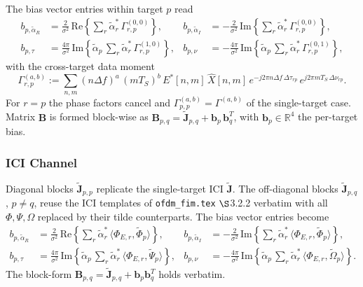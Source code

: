 \documentclass[11pt]{article}
\begin{document}
The bias vector entries within target \(p\) read
\begin{align}
    b_{p, \tilde{\alpha}_R} &= \tfrac{2}{\sigma^2}\, \mathrm{Re}\!\left\{ \sum_r \tilde{\alpha}_r^*\, \Gamma_{r,p}^{(0,0)} \right\}, &
    b_{p, \tilde{\alpha}_I} &= -\tfrac{2}{\sigma^2}\, \mathrm{Im}\!\left\{ \sum_r \tilde{\alpha}_r^*\, \Gamma_{r,p}^{(0,0)} \right\}, \\
    b_{p, \tau} &= \tfrac{4\pi}{\sigma^2}\, \mathrm{Im}\!\left\{ \tilde{\alpha}_p\, \sum_r \tilde{\alpha}_r^*\, \Gamma_{r,p}^{(1,0)} \right\}, &
    b_{p, \nu} &= -\tfrac{4\pi}{\sigma^2}\, \mathrm{Im}\!\left\{ \tilde{\alpha}_p\, \sum_r \tilde{\alpha}_r^*\, \Gamma_{r,p}^{(0,1)} \right\},
\end{align}
with the cross-target data moment
\begin{equation}
    \Gamma_{r,p}^{(a,b)} := \sum_{n,m} (n\Delta f)^a\, (mT_S)^b\, E^*[n,m]\, \hat{X}[n,m]\, e^{-j2\pi n\Delta f\, \Delta\tau_{rp}}\, e^{j2\pi mT_S\, \Delta\nu_{rp}}.
\end{equation}
For \(r = p\) the phase factors cancel and \(\Gamma_{p,p}^{(a,b)} = \Gamma^{(a,b)}\) of the single-target case. Matrix \(\bm{B}\) is formed block-wise as \(\bm{B}_{p,q} = \tilde{\bm{J}}_{p,q} + \bm{b}_p\, \bm{b}_q^T\), with \(\bm{b}_p \in \mathbb{R}^4\) the per-target bias.

\subsubsection{ICI Channel}

Diagonal blocks \(\tilde{\bm{J}}_{p,p}\) replicate the single-target ICI \(\tilde{\bm{J}}\). The off-diagonal blocks \(\tilde{\bm{J}}_{p,q}\), \(p \neq q\), reuse the ICI templates of \texttt{ofdm\_fim.tex} \(\S\)3.2.2 verbatim with all \(\Phi, \Psi, \Omega\) replaced by their tilde counterparts. The bias vector entries become
\begin{align}
    b_{p, \tilde{\alpha}_R} &= \tfrac{2}{\sigma^2}\, \mathrm{Re}\!\left\{ \sum_r \tilde{\alpha}_r^*\, \langle \Phi_{E,r}, \tilde{\Phi}_p \rangle \right\}, &
    b_{p, \tilde{\alpha}_I} &= -\tfrac{2}{\sigma^2}\, \mathrm{Im}\!\left\{ \sum_r \tilde{\alpha}_r^*\, \langle \Phi_{E,r}, \tilde{\Phi}_p \rangle \right\}, \\
    b_{p, \tau} &= \tfrac{4\pi}{\sigma^2}\, \mathrm{Im}\!\left\{ \tilde{\alpha}_p\, \sum_r \tilde{\alpha}_r^*\, \langle \Phi_{E,r}, \tilde{\Psi}_p \rangle \right\}, &
    b_{p, \nu} &= -\tfrac{4\pi}{\sigma^2}\, \mathrm{Im}\!\left\{ \tilde{\alpha}_p\, \sum_r \tilde{\alpha}_r^*\, \langle \Phi_{E,r}, \tilde{\Omega}_p \rangle \right\}.
\end{align}
The block-form \(\bm{B}_{p,q} = \tilde{\bm{J}}_{p,q} + \bm{b}_p\bm{b}_q^T\) holds verbatim.
\end{document}
